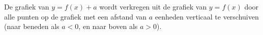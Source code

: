 \begin{center}
	
\end{center}



De grafiek van $y=f(x)+a$ wordt verkregen uit de grafiek
van $y=f(x)$ door alle punten op de grafiek met een afstand van $a$
eenheden verticaal te verschuiven (naar beneden als $a<0$, en naar
boven als $a>0$).

\begin{center}
	
\end{center}


\begin{center}
	
\end{center}






